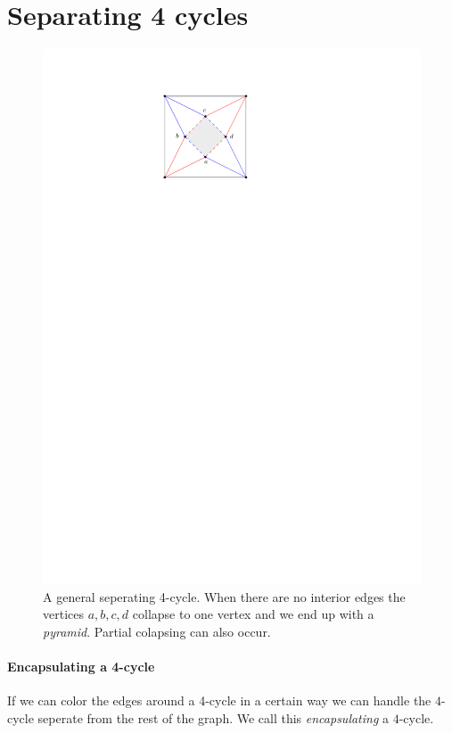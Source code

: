\documentclass[a4paper]{article}
\theoremstyle{definition}
\begin{document}
\section{Separating 4 cycles}

\begin{figure}[h!]
\centering
\includegraphics[scale=1]{img/general4cycle}

\caption{A general seperating 4-cycle. When there are no interior edges the vertices $a,b,c,d$ collapse to one vertex and we end up with a \emph{pyramid}. Partial colapsing can also occur.
    \label{fig: }}
\end{figure}

\paragraph{Encapsulating a 4-cycle}
If we can color the edges around a 4-cycle in a certain way we can handle the $4$-cycle seperate from the rest of the graph. We call this \emph{encapsulating} a $4$-cycle.
\end{document}
